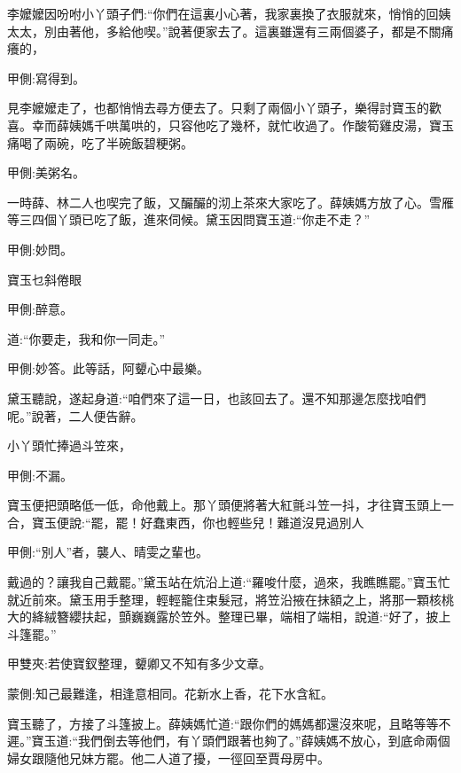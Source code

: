 \begin{parag}
    李嬤嬤因吩咐小丫頭子們:“你們在這裏小心著，我家裏換了衣服就來，悄悄的回姨太太，別由著他，多給他喫。”說著便家去了。這裏雖還有三兩個婆子，都是不關痛癢的，\begin{note}甲側:寫得到。\end{note}見李嬤嬤走了，也都悄悄去尋方便去了。只剩了兩個小丫頭子，樂得討寶玉的歡喜。幸而薛姨媽千哄萬哄的，只容他吃了幾杯，就忙收過了。作酸筍雞皮湯，寶玉痛喝了兩碗，吃了半碗飯碧粳粥。\begin{note}甲側:美粥名。\end{note}一時薛、林二人也喫完了飯，又釅釅的沏上茶來大家吃了。薛姨媽方放了心。雪雁等三四個丫頭已吃了飯，進來伺候。黛玉因問寶玉道:“你走不走？”\begin{note}甲側:妙問。\end{note}寶玉乜斜倦眼\begin{note}甲側:醉意。\end{note}道:“你要走，我和你一同走。”\begin{note}甲側:妙答。此等話，阿顰心中最樂。\end{note}黛玉聽說，遂起身道:“咱們來了這一日，也該回去了。還不知那邊怎麼找咱們呢。”說著，二人便告辭。
\end{parag}


\begin{parag}
    小丫頭忙捧過斗笠來，\begin{note}甲側:不漏。\end{note}寶玉便把頭略低一低，命他戴上。那丫頭便將著大紅氈斗笠一抖，才往寶玉頭上一合，寶玉便說:“罷，罷！好蠢東西，你也輕些兒！難道沒見過別人\begin{note}甲側:“別人”者，襲人、晴雯之輩也。\end{note}戴過的？讓我自己戴罷。”黛玉站在炕沿上道:“羅唆什麼，過來，我瞧瞧罷。”寶玉忙就近前來。黛玉用手整理，輕輕籠住束髮冠，將笠沿掖在抹額之上，將那一顆核桃大的絳絨簪纓扶起，顫巍巍露於笠外。整理已畢，端相了端相，說道:“好了，披上斗篷罷。”\begin{note}甲雙夾:若使寶釵整理，顰卿又不知有多少文章。\end{note}\begin{note}蒙側:知己最難逢，相逢意相同。花新水上香，花下水含紅。\end{note}寶玉聽了，方接了斗篷披上。薛姨媽忙道:“跟你們的媽媽都還沒來呢，且略等等不遲。”寶玉道:“我們倒去等他們，有丫頭們跟著也夠了。”薛姨媽不放心，到底命兩個婦女跟隨他兄妹方罷。他二人道了擾，一徑回至賈母房中。
\end{parag}


